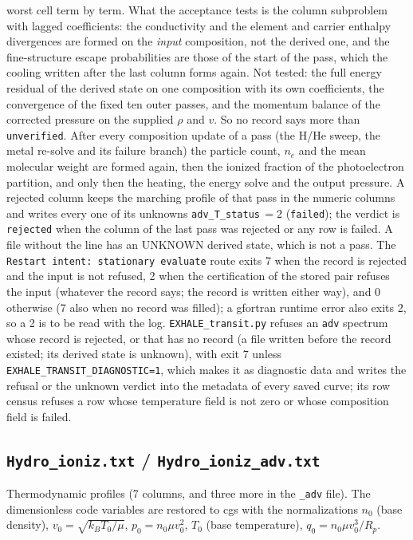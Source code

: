 \documentclass[english,a4paper]{my_memo}
\begin{document}
worst cell term by term. What the acceptance tests is the column
subproblem with lagged coefficients: the conductivity and the element and
carrier enthalpy divergences are formed on the \emph{input} composition,
not the derived one, and the fine-structure escape probabilities are those
of the start of the pass, which the cooling written after the last column
forms again. Not tested: the full energy residual of the derived state on
one composition with its own coefficients, the convergence of the fixed ten
outer passes, and the momentum balance of the corrected pressure on the
supplied $\rho$ and $v$. So no record says more than \texttt{unverified}.
After every composition update of a pass (the H/He sweep, the metal
re-solve and its failure branch) the particle count, $n_e$ and the mean
molecular weight are formed again, then the ionized fraction of the
photoelectron partition, and only then the heating, the energy solve and
the output pressure. A rejected column keeps the marching profile of that
pass in the numeric columns and writes every one of its unknowns
\texttt{adv\_T\_status}\,$=2$ (\texttt{failed}); the verdict is
\texttt{rejected} when the column of the last pass was rejected or any row is
failed. A file without the line has an UNKNOWN derived state, which is not
a pass. The
\texttt{Restart intent: stationary evaluate} route exits 7 when the record is
rejected and the input is not refused, 2 when the certification of the
stored pair refuses the input (whatever the record says; the record is written either way), and 0
otherwise (7 also when no record was filled); a gfortran runtime error
also exits 2, so a 2 is to be read with the log. \texttt{EXHALE\_transit.py} refuses an \texttt{adv} spectrum
whose record is rejected, or that has no record (a file written before the
record existed; its derived state is unknown), with exit 7 unless
\texttt{EXHALE\_TRANSIT\_DIAGNOSTIC=1}, which makes it as diagnostic data and
writes the refusal or the unknown verdict into the metadata of every saved
curve; its row census refuses a row whose temperature field is not
zero or whose composition field is failed.

\subsection{\texttt{Hydro\_ioniz.txt} / \texttt{Hydro\_ioniz\_adv.txt}}
\label{sec:hydroioniz}
Thermodynamic profiles (7 columns, and three more in the \texttt{\_adv} file). The
dimensionless code variables are
restored to cgs with the normalizations $n_0$ (base density), $v_0=\sqrt{k_BT_0/\mu}$,
$p_0=n_0\mu v_0^2$, $T_0$ (base temperature), $q_0=n_0\mu v_0^3/R_p$.
\end{document}

